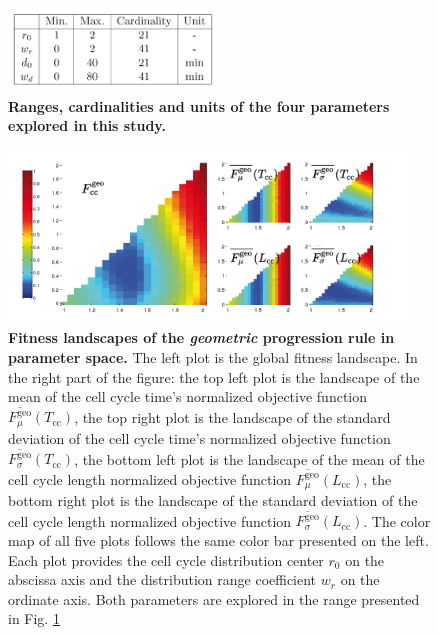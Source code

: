 \begin{figure}
\begin{center}
\includegraphics[width=0.5\textwidth]{../../images/Cases_Studies/Case_1_Division/parameter_space_table/parameter_space_table.png}
\end{center}
\caption{\textbf{Ranges, cardinalities and units of the four parameters explored in this study.}}
\label{Case_1_Division_parameter_space_table_parameter_space_table}
\end{figure}
\begin{figure}
\begin{center}
\includegraphics[width=0.95\textwidth]{../../images/Cases_Studies/Case_1_Division/071222bF_t_selection_1_all_T_121224_fitness_geo_ok.png}
\end{center}
\caption{\textbf{Fitness landscapes of the \textit{geometric} progression rule in parameter space.} The left plot is the global fitness landscape. In the right part of the figure: the top left plot is the landscape of the mean of the cell cycle time's normalized objective function $\overline{F^{\mathrm{geo}}_{\mu}}(T_{\mathrm{cc}})$, the top right plot is the landscape of the standard deviation of the cell cycle time's normalized objective function $\overline{F^{\mathrm{geo}}_{\sigma}}(T_{\mathrm{cc}})$, the bottom left plot is the landscape of the mean of the cell cycle length normalized objective function $\overline{F^{\mathrm{geo}}_{\mu}}(L_{\mathrm{cc}})$, the bottom right plot is the landscape of the standard deviation of the cell cycle length normalized objective function $\overline{F^{\mathrm{geo}}_{\sigma}}(L_{\mathrm{cc}})$. The color map of all five plots follows the same color bar presented on the left. Each plot provides the cell cycle distribution center $r_0$ on the abscissa axis and the distribution range coefficient $w_r$ on the ordinate axis. Both parameters are explored in the range presented in Fig. \ref{Case_1_Division_parameter_space_table_parameter_space_table}}
\label{071222bF_t_selection_1_all_T_121224_fitness_geo_ok}
\end{figure}
